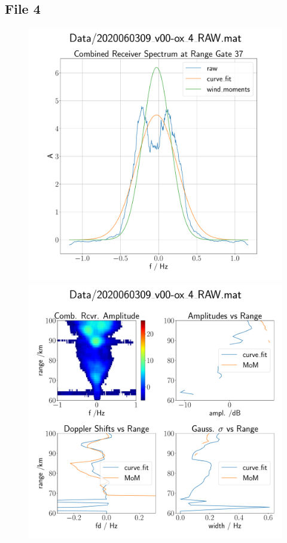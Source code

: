 \subsection{File 4}
\begin{figure}[H]
  \begin{minipage}[t]{0.45\textwidth}
    \centering
    \includegraphics[width=\textwidth]{graphics/data_3_single_rg.pdf}
    \caption{}
  \end{minipage}\hfill
  \begin{minipage}[t]{0.45\textwidth}
    \centering
    \includegraphics[width=\textwidth]{graphics/data_3_quad.pdf}
    \caption{}
   \end{minipage}
\end{figure}


